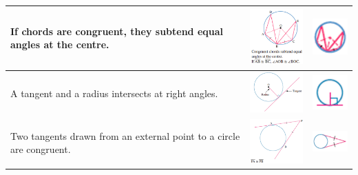 \documentclass[a4paper,10pt]{report}
\begin{document}
\begin{center}
\begin{tabular}[center]{|p{5cm}|p{3cm}|p{2cm}|}
		If chords are congruent, they subtend equal angles at the centre.                                                                                                                              & \includegraphics[width=3cm]{circle theorem 7}  & \includegraphics[width=2cm]{circle theorem 7 symbol}  \\ \hline
		A tangent and a radius intersects at right angles.                                                                                                                                             & \includegraphics[width=3cm]{circle theorem 8}  & \includegraphics[width=2cm]{circle theorem 8 symbol}  \\ \hline
		Two tangents drawn from an external point to a circle are congruent.                                                                                                                           & \includegraphics[width=3cm]{circle theorem 9}  & \includegraphics[width=2cm]{circle theorem 9 symbol}  \\ \hline

\end{tabular}
\end{center}
\end{document}
